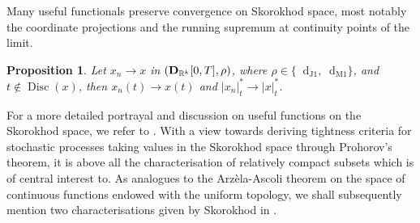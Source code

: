 \documentclass[11pt]{article}
\newtheorem{prop}[theorem]{Proposition}
\theoremstyle{definition}\newtheorem{example}[theorem]{Example}
\theoremstyle{definition}\newtheorem{counterexample}[theorem]{Counterexample}
\theoremstyle{definition}\newtheorem{remark}[theorem]{Remark}
\theoremstyle{definition}\newtheorem{defi}[theorem]{Definition}
\numberwithin{equation}{section}
\newcommand{\R}{\mathbb{R}}
\newcommand{\D}{{\bf D}}											%
\newcommand*\diff{\mathop{}\!\mathrm{d}}								%
\renewcommand{\|}{\; : \, \;}											%
\newcommand{\dJ}{\diff_{\operatorname{J1}}}								%
\newcommand{\dM}{\diff_{\operatorname{M1}}}							%
\begin{document}
Many useful functionals preserve convergence on Skorokhod space, most notably the coordinate projections and the running supremum at continuity points of the limit. 
\begin{prop}
	Let $x_n \to x$ in $(\D_{\R^{k}}[0,T], \rho)$, where $\rho \in \{ \dJ, \dM\}$, and $t \notin \operatorname{Disc}(x)$, then $x_n(t) \to x(t)$ and $|x_n|_t^* \to |x|_t^*$.
\end{prop}
For a more detailed portrayal and discussion on useful functions on the Skorokhod space, we refer to \cite{whitt2, whitt}. With a view towards deriving tightness criteria for stochastic processes taking values in the Skorokhod space through Prohorov's theorem, it is above all the characterisation of relatively compact subsets which is of central interest to. As analogues to the Arzèla-Ascoli theorem on the space of continuous functions endowed with the uniform topology, we shall subsequently mention two characterisations given by Skorokhod in \cite{skorokhod}.
\end{document}
